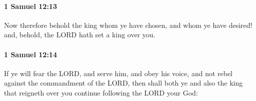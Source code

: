 		\paragraph{1 Samuel 12:13} %
			\label{1SAMUEL-12-13}

			Now therefore behold the king whom ye have chosen, and whom ye have desired! and, behold, the LORD hath set a king over you.


		\paragraph{1 Samuel 12:14} %
			\label{1SAMUEL-12-14}

			If ye will fear the LORD, and serve him, and obey his voice, and not rebel against the commandment of the LORD, then shall both ye and also the king that reigneth over you continue following the LORD your God:


